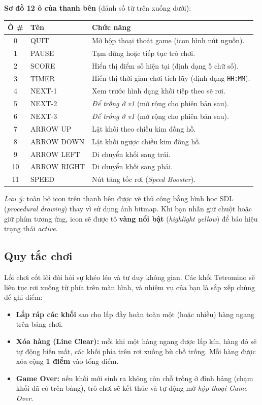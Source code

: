 \documentclass[12pt,a4paper]{article}
\begin{document}
\noindent\textbf{Sơ đồ 12 ô của thanh bên} (đánh số từ trên xuống dưới):

\vspace{4pt}
\begin{tabularx}{\linewidth}{|c|l|X|}
    \hline
    \textbf{Ô \#} & \textbf{Tên} & \textbf{Chức năng} \\
    \hline
    0  & QUIT        & Mở hộp thoại thoát game (icon hình nút nguồn).
\\
    \hline
    1  & PAUSE       & Tạm dừng hoặc tiếp tục trò chơi.
\\
    \hline
    2  & SCORE       & Hiển thị điểm số hiện tại (định dạng 5 chữ số).
\\
    \hline
    3  & TIMER       & Hiển thị thời gian chơi tích lũy (định dạng \texttt{HH:MM}).
\\
    \hline
    4  & NEXT-1      & Xem trước hình dạng khối tiếp theo sẽ rơi.
\\
    \hline
    5  & NEXT-2      & \textit{Để trống ở v1} (mở rộng cho phiên bản sau).
\\
    \hline
    6  & NEXT-3      & \textit{Để trống ở v1} (mở rộng cho phiên bản sau).
\\
    \hline
    7  & ARROW UP    & Lật khối theo chiều kim đồng hồ.
\\
    \hline
    8  & ARROW DOWN  & Lật khối ngược chiều kim đồng hồ.
\\
    \hline
    9  & ARROW LEFT  & Di chuyển khối sang trái.
\\
    \hline
    10 & ARROW RIGHT & Di chuyển khối sang phải.
\\
    \hline
    11 & SPEED       & Nút tăng tốc rơi (\textit{Speed Booster}).
\\
    \hline
\end{tabularx}

\vspace{4pt}
\noindent\textit{Lưu ý:} toàn bộ icon trên thanh bên được vẽ thủ công bằng hình học SDL (\textit{procedural drawing}) thay vì sử dụng ảnh bitmap.
Khi bạn nhấn giữ chuột hoặc giữ phím tương ứng, icon sẽ được tô \textbf{vàng nổi bật} (\textit{highlight yellow}) để báo hiệu trạng thái \textit{active}.
\subsection{Quy tắc chơi}
Lối chơi cốt lõi đòi hỏi sự khéo léo và tư duy không gian.
Các khối Tetromino sẽ liên tục rơi xuống từ phía trên màn hình, và nhiệm vụ của bạn là sắp xếp chúng để ghi điểm:
\begin{itemize}
    \item \textbf{Lắp ráp các khối} sao cho lấp đầy hoàn toàn một (hoặc nhiều) hàng ngang trên bảng chơi.
    \item \textbf{Xóa hàng (Line Clear):} mỗi khi một hàng ngang được lấp kín, hàng đó sẽ tự động biến mất, các khối phía trên rơi xuống bù chỗ trống.
Mỗi hàng được xóa cộng \textbf{1 điểm} vào tổng điểm.
    \item \textbf{Game Over:} nếu khối mới sinh ra không còn chỗ trống ở đỉnh bảng (chạm khối đã có trên bảng), trò chơi sẽ kết thúc và tự động mở \textit{hộp thoại Game Over}.
\end{itemize}
\end{document}
